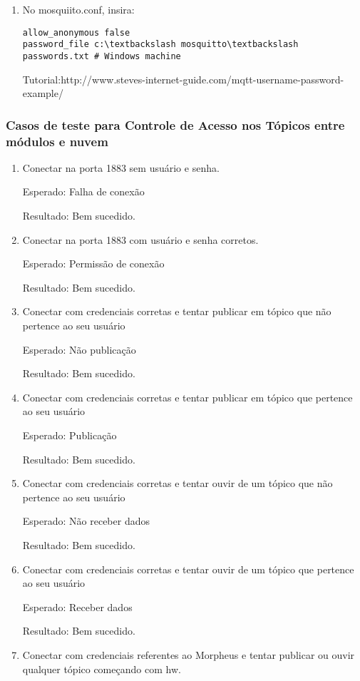 \begin{enumerate}
\begin{enumerate}
\item No mosquiito.conf, insira:

\begin{lstlisting}
allow_anonymous false
password_file c:\textbackslash mosquitto\textbackslash passwords.txt # Windows machine
\end{lstlisting}
Tutorial:http://www.steves-internet-guide.com/mqtt-username-password-example/


\end{enumerate}


\subsubsection{Casos de teste para Controle de Acesso nos Tópicos \wmqtt entre módulos e nuvem}
\begin{enumerate}
\item
Conectar na porta 1883 sem usuário e senha.

Esperado: Falha de conexão

Resultado: Bem sucedido.
\item Conectar na porta 1883 com usuário e senha corretos.

Esperado: Permissão de conexão

Resultado: Bem sucedido.
\item
Conectar com credenciais corretas e tentar publicar em tópico que não pertence ao seu usuário

Esperado: Não publicação

Resultado: Bem sucedido.
\item
Conectar com credenciais corretas e tentar publicar em tópico que pertence ao seu usuário

Esperado: Publicação

Resultado: Bem sucedido.
\item
Conectar com credenciais corretas e tentar ouvir de um tópico que não pertence ao seu usuário

Esperado: Não receber dados

Resultado: Bem sucedido.
\item
Conectar com credenciais corretas e tentar ouvir de um tópico que pertence ao seu usuário

Esperado: Receber dados

Resultado: Bem sucedido.

\item
Conectar com credenciais referentes ao Morpheus e tentar publicar ou ouvir qualquer tópico começando com hw.


\end{enumerate}
\end{enumerate}
